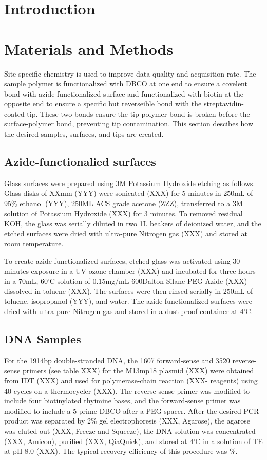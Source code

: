 \documentclass[%
  aip,12pt,tightenlines,
  amsthm,
 amsmath,amssymb,
 reprint,%
]{revtex4-1}
\newcommand{\sLabel}[1]{\label{section:#1}}
\newcommand{\firstp}[0]{\noindent}
\newcommand{\pl}[0]{\vspace{6pt}}
\begin{document}
\section{\sLabel{Intro}Introduction}

\section{\sLabel{Materials}Materials and Methods}

Site-specific chemistry is used to improve data quality and acquisition rate. The sample polymer is functionalized with DBCO at one end to ensure a covelent bond with azide-functionalized surface and functionalized with biotin at the opposite end to ensure a specific but reverseible bond with the streptavidin-coated tip. These two bonds ensure the tip-polymer bond is broken before the surface-polymer bond, preventing tip contamination. This section descibes how the desired samples, surfaces, and tips are created.

\subsection{\sLabel{Surface}Azide-functionalied surfaces}

\firstp Glass surfaces were prepared using 3M Potassium Hydroxide etching as follows. Glass disks of XXmm (YYY) were sonicated (XXX) for 5 minutes in 250mL of 95\% ethanol (YYY), 250ML ACS grade acetone (ZZZ), transferred to a 3M solution of Potassium Hydroxide (XXX) for 3 minutes. To removed residual KOH, the glass was serially diluted in two 1L beakers of deionized water, and the etched surfaces were dried with ultra-pure Nitrogen gas (XXX) and stored at room temperature. \pl

To create azide-functionalized surfaces, etched glass was activated using 30 minutes exposure in a UV-ozone chamber (XXX) and incubated for three hours in a 70mL, 60'C solution of 0.15mg/mL 600Dalton Silane-PEG-Azide (XXX) dissolved in toluene (XXX). The surfaces were then rinsed serially in 250mL of toluene, isopropanol (YYY), and water. The azide-functionalized surfaces were dried with ultra-pure Nitrogen gas and stored in a dust-proof container at 4'C. \pl 

\subsection{\sLabel{Sample}DNA Samples}

\firstp For the 1914bp double-stranded DNA, the 1607 forward-sense and 3520 reverse-sense primers (see table XXX) for the M13mp18 plasmid (XXX) were obtained from IDT (XXX) and used for polymerase-chain reaction (XXX- reagents) using 40 cycles on a thermocycler (XXX). The reverse-sense primer was modified to include four biotinylated thyimine bases, and the forward-sense primer was modified to include a 5-prime DBCO after a PEG-spacer. After the desired PCR product was separated by 2\% gel electrophoresis (XXX, Agarose), the agarose was eluted out (XXX, Freeze and Squeeze), the DNA solution was concentrated (XXX, Amicon), purified (XXX, QiaQuick), and stored at 4'C in a solution of TE at pH 8.0 (XXX). The typical recovery efficiency of this procedure was \%. \pl 
\end{document}
